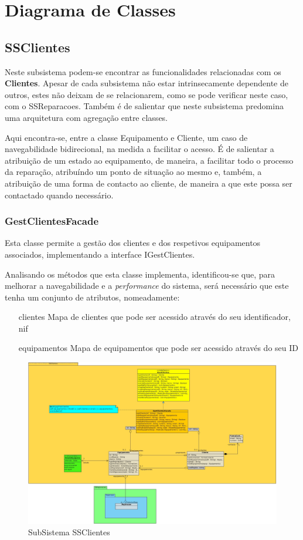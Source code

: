 \documentclass[a4paper,12pt]{scrreprt}
\begin{document}
\section{Diagrama de Classes} \label{sec:diagrama_classe}

\subsection{SSClientes} 
Neste subsistema podem-se encontrar as funcionalidades relacionadas com os \textbf{Clientes}. 
Apesar de cada subsistema não estar intrinsecamente dependente de outros, estes não deixam de 
se relacionarem, como se pode verificar neste caso, com o SSReparacoes. Também é de salientar que neste
subsistema predomina uma arquitetura com agregação entre classes.


Aqui encontra-se, entre a classe Equipamento e Cliente, um caso de navegabilidade bidirecional, 
na medida a facilitar o acesso. É de salientar a atribuição de um estado ao equipamento, de maneira, a facilitar todo o processo da reparação, 
atribuíndo um ponto de situação ao mesmo e, também, a atribuição de uma forma de contacto ao cliente, de maneira a que este possa ser contactado quando necessário.


\subsubsection{GestClientesFacade}
Esta classe permite a gestão dos clientes e dos respetivos equipamentos associados, implementando a interface IGestClientes.

Analisando os métodos que esta classe implementa, identificou-se que, para melhorar a navegabilidade
e a \textit{performance} do sistema, será necessário que este tenha um conjunto de atributos, nomeadamente:
\begin{itemize}
    \item[clientes]{Mapa de clientes que pode ser acessido através do seu identificador, nif}
    \item[equipamentos]{Mapa de equipamentos que pode ser acessido através do seu ID} 
\end{itemize}

\begin{figure}[!ht]
    \centering
    \includegraphics[scale=0.45]{SSClientes.jpg}
    \caption{SubSistema SSClientes}
\end{figure}
\end{document}
